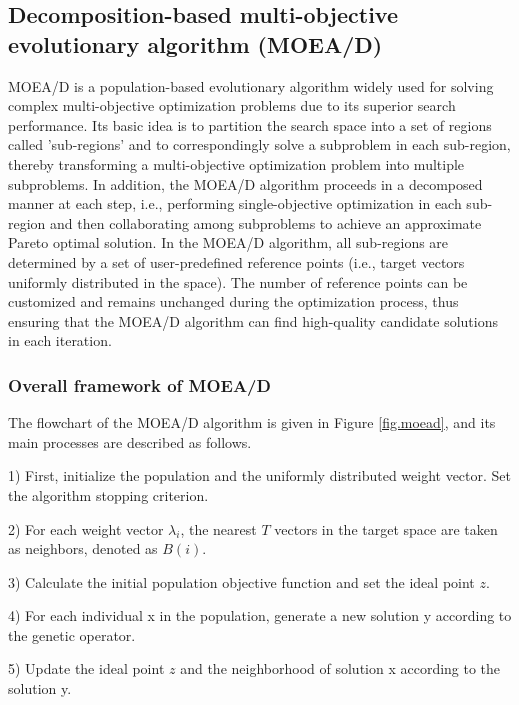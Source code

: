 \documentclass[10pt]{mcmthesis}
\begin{document}

\subsection{Decomposition-based multi-objective evolutionary algorithm (MOEA/D)}

MOEA/D is a population-based evolutionary algorithm widely used for solving complex multi-objective optimization problems due to its superior search performance. Its basic idea is to partition the search space into a set of regions called 'sub-regions' and to correspondingly solve a subproblem in each sub-region, thereby transforming a multi-objective optimization problem into multiple subproblems. In addition, the MOEA/D algorithm proceeds in a decomposed manner at each step, i.e., performing single-objective optimization in each sub-region and then collaborating among subproblems to achieve an approximate Pareto optimal solution. In the MOEA/D algorithm, all sub-regions are determined by a set of user-predefined reference points (i.e., target vectors uniformly distributed in the space). The number of reference points can be customized and remains unchanged during the optimization process, thus ensuring that the MOEA/D algorithm can find high-quality candidate solutions in each iteration.

\subsubsection{Overall framework of MOEA/D}
The flowchart of the MOEA/D algorithm is given in Figure \ref{fig.moead}, and its main processes are described as follows.

    1) First, initialize the population and the uniformly distributed weight vector. Set the algorithm stopping criterion.
    
    2) For each weight vector $\lambda_{i}$, the nearest $T$ vectors in the target space are taken as neighbors, denoted as $B(i)$.
    
    3) Calculate the initial population objective function and set the ideal point $z$.
    
    4) For each individual x in the population, generate a new solution y according to the genetic operator.
    
    5) Update the ideal point $z$ and the neighborhood of solution x according to the solution y.
    
\end{document}
